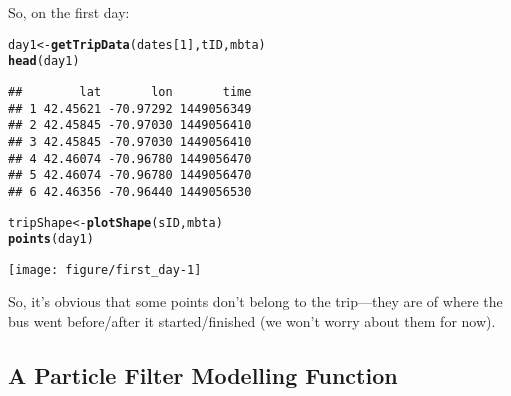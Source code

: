 \documentclass[11pt]{article}\usepackage[]{graphicx}\usepackage[]{color}
\makeatletter
\def\maxwidth{ %
  \ifdim\Gin@nat@width>\linewidth
    \linewidth
  \else
    \Gin@nat@width
  \fi
}
\newcommand{\hlnum}[1]{\textcolor[rgb]{0.686,0.059,0.569}{#1}}%
\newcommand{\hlstd}[1]{\textcolor[rgb]{0.345,0.345,0.345}{#1}}%
\newcommand{\hlkwb}[1]{\textcolor[rgb]{0.69,0.353,0.396}{#1}}%
\newcommand{\hlkwd}[1]{\textcolor[rgb]{0.737,0.353,0.396}{\textbf{#1}}}%
\newenvironment{kframe}{%
 \def\at@end@of@kframe{}%
 \ifinner\ifhmode%
  \def\at@end@of@kframe{\end{minipage}}%
  \begin{minipage}{\columnwidth}%
 \fi\fi%
 \def\FrameCommand##1{\hskip\@totalleftmargin \hskip-\fboxsep
 \colorbox{shadecolor}{##1}\hskip-\fboxsep
     \hskip-\linewidth \hskip-\@totalleftmargin \hskip\columnwidth}%
 \MakeFramed {\advance\hsize-\width
   \@totalleftmargin\z@ \linewidth\hsize
   \@setminipage}}%
 {\par\unskip\endMakeFramed%
 \at@end@of@kframe}
\newenvironment{knitrout}{}{} %
\makeatother
\begin{document}
So, on the first day:
\begin{knitrout}
\color{fgcolor}\begin{kframe}
\begin{alltt}
\hlstd{day1} \hlkwb{<-} \hlkwd{getTripData}\hlstd{(dates[}\hlnum{1}\hlstd{], tID, mbta)}
\hlkwd{head}\hlstd{(day1)}
\end{alltt}
\begin{verbatim}
##        lat       lon       time
## 1 42.45621 -70.97292 1449056349
## 2 42.45845 -70.97030 1449056410
## 3 42.45845 -70.97030 1449056410
## 4 42.46074 -70.96780 1449056470
## 5 42.46074 -70.96780 1449056470
## 6 42.46356 -70.96440 1449056530
\end{verbatim}
\begin{alltt}
\hlstd{tripShape} \hlkwb{<-} \hlkwd{plotShape}\hlstd{(sID, mbta)}
\hlkwd{points}\hlstd{(day1)}
\end{alltt}
\end{kframe}

{\centering \texttt{[image: figure/first\_day-1]} 

}



\end{knitrout}

So, it's obvious that some points don't belong to the trip---they are of where the bus went
before/after it started/finished (we won't worry about them for now).

\subsection{A Particle Filter Modelling Function}
\end{document}
